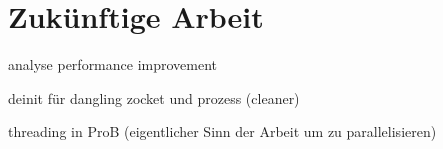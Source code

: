 

\section{Zukünftige Arbeit}

    analyse performance improvement

 deinit für dangling zocket und prozess (cleaner)

 threading in ProB (eigentlicher Sinn der Arbeit um zu parallelisieren)
